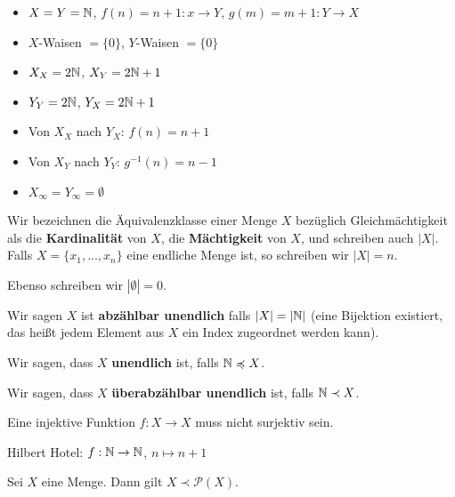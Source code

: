 \documentclass[main.tex]{subfiles}
\begin{document}
\begin{Beispiel}
  \begin{itemize}
    \item $X=Y=\mathbb{N}$, $f(n)=n+1:x\to Y$, $g(m)=m+1:Y\to X$
    \item $X$-Waisen $= \{ 0 \}$, $Y$-Waisen $= \{ 0 \}$
    \item $X_X = 2 \mathbb{N}$, $X_Y = 2\mathbb{N} +1$
    \item $Y_Y = 2 \mathbb{N}$, $Y_X = 2\mathbb{N} +1$
    \item Von $X_X$ nach $Y_X$: $f(n)=n+1$
    \item Von $X_Y$ nach $Y_Y$: $g^{-1}(n)=n-1$
    \item $X_\infty = Y_\infty = \emptyset$
  \end{itemize}
\end{Beispiel}


\begin{Definition}
  Wir bezeichnen die Äquivalenzklasse einer Menge $X$ bezüglich Gleichmächtigkeit als die \textbf{Kardinalität} von $X$, die \textbf{Mächtigkeit} von $X$, und schreiben auch $|X|$. Falls $X= \{x_1,...,x_n\}$ eine endliche Menge ist, so schreiben wir $|X|=n$.

  Ebenso schreiben wir $|\emptyset| = 0$.
\end{Definition}

\begin{Definition}[Unendlichkeit]
  Wir sagen $X$ ist \textbf{abzählbar unendlich} falls $|X| = |\mathbb{N}|$ (eine Bijektion existiert, das heißt jedem Element aus $X$ ein Index zugeordnet werden kann).

  Wir sagen, dass $X$ \textbf{unendlich} ist, falls $\mathbb{N} \preccurlyeq X$.

  Wir sagen, dass $X$ \textbf{überabzählbar unendlich} ist, falls $\mathbb{N} \prec X$.
\end{Definition}

\begin{Bemerkung}
  Eine injektive Funktion $f: X \to X$ muss nicht surjektiv sein.

  Hilbert Hotel: $f:\mathbb{N} \to \mathbb{N}$, $n \mapsto n+1$
\end{Bemerkung}

\begin{Theorem}
  Sei $X$ eine Menge. Dann gilt $X \prec \mathcal{P}(X)$.
\end{Theorem}
\end{document}
